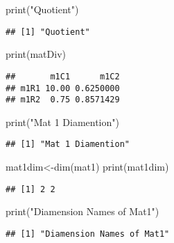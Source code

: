 \documentclass[
]{article}
\newenvironment{Shaded}{\begin{snugshade}}{\end{snugshade}}
\newcommand{\FunctionTok}[1]{\textcolor[rgb]{0.00,0.00,0.00}{#1}}
\newcommand{\NormalTok}[1]{#1}
\newcommand{\OtherTok}[1]{\textcolor[rgb]{0.56,0.35,0.01}{#1}}
\newcommand{\StringTok}[1]{\textcolor[rgb]{0.31,0.60,0.02}{#1}}
\begin{document}
\begin{Shaded}
\begin{Highlighting}[]
\FunctionTok{print}\NormalTok{(}\StringTok{"Quotient"}\NormalTok{)}
\end{Highlighting}
\end{Shaded}

\begin{verbatim}
## [1] "Quotient"
\end{verbatim}

\begin{Shaded}
\begin{Highlighting}[]
\FunctionTok{print}\NormalTok{(matDiv)}
\end{Highlighting}
\end{Shaded}

\begin{verbatim}
##       m1C1      m1C2
## m1R1 10.00 0.6250000
## m1R2  0.75 0.8571429
\end{verbatim}

\begin{Shaded}
\begin{Highlighting}[]
\FunctionTok{print}\NormalTok{(}\StringTok{"Mat 1 Diamention"}\NormalTok{)}
\end{Highlighting}
\end{Shaded}

\begin{verbatim}
## [1] "Mat 1 Diamention"
\end{verbatim}

\begin{Shaded}
\begin{Highlighting}[]
\NormalTok{mat1dim}\OtherTok{\textless{}{-}}\FunctionTok{dim}\NormalTok{(mat1)}
\FunctionTok{print}\NormalTok{(mat1dim)}
\end{Highlighting}
\end{Shaded}

\begin{verbatim}
## [1] 2 2
\end{verbatim}

\begin{Shaded}
\begin{Highlighting}[]
\FunctionTok{print}\NormalTok{(}\StringTok{"Diamension Names of Mat1"}\NormalTok{)}
\end{Highlighting}
\end{Shaded}

\begin{verbatim}
## [1] "Diamension Names of Mat1"
\end{verbatim}
\end{document}
